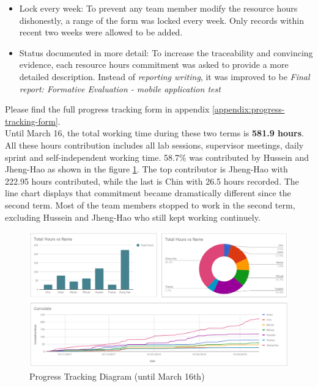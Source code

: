 \documentclass[12pt,a4paper]{article}
\begin{document}
          \begin{itemize}
            \item {Lock every week}: To prevent any team member modify the resource hours dishonestly, a range of the form was locked every week. Only records within recent two weeks were allowed to be added. 
            \item {Status documented in more detail}: To increase the traceability and convincing evidence, each resource hours commitment was asked to provide a more detailed description. Instead of {\it reporting writing}, it was improved to be {\it Final report: Formative Evaluation - mobile application test}
          \end{itemize}

          Please find the full progress tracking form in appendix \ref{appendix:progress-tracking-form}.\\
          
          Until March 16, the total working time during these two terms is {\bf 581.9 hours}. All these hours contribution includes all lab sessions, supervisor meetings, daily sprint and self-independent working time. 58.7\% was contributed by Hussein and Jheng-Hao as shown in the figure \ref{fig:Progress Tracking Diagram}. The top contributor is Jheng-Hao with 222.95 hours contributed, while the last is Chin with 26.5 hours recorded. The line chart displays that commitment became dramatically different since the second term. Most of the team members stopped to work in the second term, excluding Hussein and Jheng-Hao who still kept working continuely.
          
          \begin{figure}[H]
            \centering
            \includegraphics[width=1\textwidth]{../assets/development-records-progress-tracking-diagram.png}
            \caption{Progress Tracking Diagram (until March 16th)}
            \label{fig:Progress Tracking Diagram}
          \end{figure}
\end{document}
